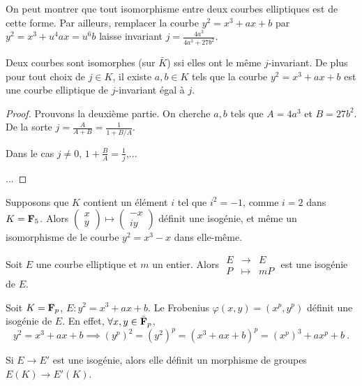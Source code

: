 	On peut montrer que tout isomorphisme entre deux courbes elliptiques est de cette forme.
	Par ailleurs, remplacer la courbe $y^2 = x^3 + a x + b$ par $y^2 = x^3 + u^4 a x = u^6 b$ laisse invariant $j = \frac{4 a^3}{4 a^3 + 27 b^2}$.
	
	\begin{thm}
		Deux courbes sont isomorphes (sur $\bar K$) ssi elles ont le même $j$-invariant.
		De plus pour tout choix de $j \in K$, il existe $a, b \in K$ tels que la courbe $y^2 = x^3 + ax + b$ est une courbe elliptique de $j$-invariant égal à $j$.
	\end{thm}
	
	\begin{proof}
		Prouvons la deuxième partie.
		On cherche $a, b$ tels que $A = 4a^3$ et $B = 27 b^2$.
		De la sorte $j = \frac{A}{A + B} = \frac{1}{1 + B/A}$.
		
		Dans le cas $j \neq 0$, $1 + \frac{B}{A} = \frac{1}{j}$,...
		
		...%
	\end{proof}
	
	\begin{ex}
		Supposons que $K$ contient un élément $i$ tel que $i^2 = -1$, comme $i = 2$ dans $K = \mathbf{F}_5$.
		Alors $\begin{pmatrix} x \\ y \end{pmatrix} \mapsto \begin{pmatrix} -x \\ iy \end{pmatrix}$ définit une isogénie, et même un isomorphisme de le courbe $y^2 = x^3 - x$ dans elle-même.
	\end{ex}
	
	\begin{ex}
		Soit $E$ une courbe elliptique et $m$ un entier.
		Alors $\begin{array}{lcr} E & \to & E \\ P & \mapsto & mP \end{array}$ est une isogénie de $E$.
	\end{ex}
	
	\begin{ex}
		Soit $K = \mathbf{F}_p$, $E : y^2 = x^3 + ax + b$.
		Le Frobenius $\varphi(x,y) = (x^p, y^p)$ définit une isogénie de $E$.
		En effet, $\forall x,y \in \bar {\mathbf{F}}_p$,
		$$y^2 = x^3 + ax + b \implies (y^p)^2 = (y^2)^p = (x^3 + ax + b)^p = (x^p)^3 + a x^p + b\ .$$
	\end{ex}
	
	\begin{thm}
		Si $E \to E'$ est une isogénie, alors elle définit un morphisme de groupes $E(K) \to E'(K)$.
	\end{thm}
	
